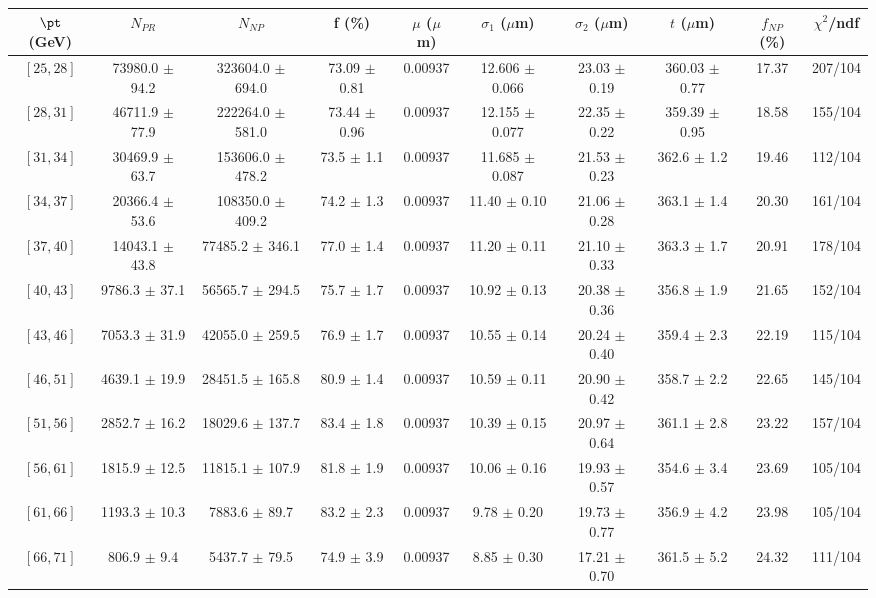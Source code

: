 \begin{tabular}{c||c|c|c|c|c|c|c||c|c}
$\pt$ (GeV) & $N_{PR}$ & $N_{NP}$ & f (\%) & $\mu$ ($\mu$m) & $\sigma_1$ ($\mu$m) & $\sigma_2$ ($\mu$m)  & $t$ ($\mu$m) & $f_{NP}$ (\%) & $\chi^2$/ndf \\
\hline
$[25, 28]$ & 73980.0 $\pm$ 94.2 & 323604.0 $\pm$ 694.0 & 73.09 $\pm$ 0.81 & 0.00937 & 12.606 $\pm$ 0.066 & 23.03 $\pm$ 0.19 & 360.03 $\pm$ 0.77 & 17.37 & 207/104\\
$[28, 31]$ & 46711.9 $\pm$ 77.9 & 222264.0 $\pm$ 581.0 & 73.44 $\pm$ 0.96 & 0.00937 & 12.155 $\pm$ 0.077 & 22.35 $\pm$ 0.22 & 359.39 $\pm$ 0.95 & 18.58 & 155/104\\
$[31, 34]$ & 30469.9 $\pm$ 63.7 & 153606.0 $\pm$ 478.2 & 73.5 $\pm$ 1.1 & 0.00937 & 11.685 $\pm$ 0.087 & 21.53 $\pm$ 0.23 & 362.6 $\pm$ 1.2 & 19.46 & 112/104\\
$[34, 37]$ & 20366.4 $\pm$ 53.6 & 108350.0 $\pm$ 409.2 & 74.2 $\pm$ 1.3 & 0.00937 & 11.40 $\pm$ 0.10 & 21.06 $\pm$ 0.28 & 363.1 $\pm$ 1.4 & 20.30 & 161/104\\
$[37, 40]$ & 14043.1 $\pm$ 43.8 & 77485.2 $\pm$ 346.1 & 77.0 $\pm$ 1.4 & 0.00937 & 11.20 $\pm$ 0.11 & 21.10 $\pm$ 0.33 & 363.3 $\pm$ 1.7 & 20.91 & 178/104\\
$[40, 43]$ & 9786.3 $\pm$ 37.1 & 56565.7 $\pm$ 294.5 & 75.7 $\pm$ 1.7 & 0.00937 & 10.92 $\pm$ 0.13 & 20.38 $\pm$ 0.36 & 356.8 $\pm$ 1.9 & 21.65 & 152/104\\
$[43, 46]$ & 7053.3 $\pm$ 31.9 & 42055.0 $\pm$ 259.5 & 76.9 $\pm$ 1.7 & 0.00937 & 10.55 $\pm$ 0.14 & 20.24 $\pm$ 0.40 & 359.4 $\pm$ 2.3 & 22.19 & 115/104\\
$[46, 51]$ & 4639.1 $\pm$ 19.9 & 28451.5 $\pm$ 165.8 & 80.9 $\pm$ 1.4 & 0.00937 & 10.59 $\pm$ 0.11 & 20.90 $\pm$ 0.42 & 358.7 $\pm$ 2.2 & 22.65 & 145/104\\
$[51, 56]$ & 2852.7 $\pm$ 16.2 & 18029.6 $\pm$ 137.7 & 83.4 $\pm$ 1.8 & 0.00937 & 10.39 $\pm$ 0.15 & 20.97 $\pm$ 0.64 & 361.1 $\pm$ 2.8 & 23.22 & 157/104\\
$[56, 61]$ & 1815.9 $\pm$ 12.5 & 11815.1 $\pm$ 107.9 & 81.8 $\pm$ 1.9 & 0.00937 & 10.06 $\pm$ 0.16 & 19.93 $\pm$ 0.57 & 354.6 $\pm$ 3.4 & 23.69 & 105/104\\
$[61, 66]$ & 1193.3 $\pm$ 10.3 & 7883.6 $\pm$ 89.7 & 83.2 $\pm$ 2.3 & 0.00937 & 9.78 $\pm$ 0.20 & 19.73 $\pm$ 0.77 & 356.9 $\pm$ 4.2 & 23.98 & 105/104\\
$[66, 71]$ & 806.9 $\pm$ 9.4 & 5437.7 $\pm$ 79.5 & 74.9 $\pm$ 3.9 & 0.00937 & 8.85 $\pm$ 0.30 & 17.21 $\pm$ 0.70 & 361.5 $\pm$ 5.2 & 24.32 & 111/104\\

\end{tabular}
